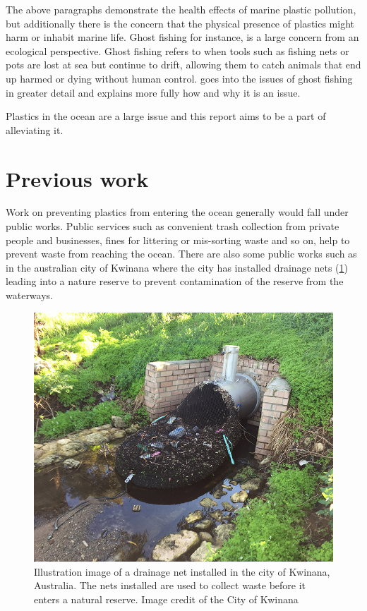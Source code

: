\documentclass[class=article, crop=false]{standalone}
\begin{document}
The above paragraphs demonstrate the health effects of marine plastic pollution, but additionally there is the concern that the physical presence of plastics might harm or inhabit marine life. Ghost fishing for instance, is a large concern from an ecological perspective. Ghost fishing refers to when tools such as fishing nets or pots are lost at sea but continue to drift, allowing them to catch animals that end up harmed or dying without human control. \citet{matsuoka_review_2005} goes into the issues of ghost fishing in greater detail and explains more fully how and why it is an issue.

Plastics in the ocean are a large issue and this report aims to be a part of alleviating it.


\section{Previous work}
Work on preventing plastics from entering the ocean generally would fall under public works. Public services such as convenient trash collection from private people and businesses, fines for littering or mis-sorting waste and so on, help to prevent waste from reaching the ocean. There are also some public works such as in the australian city of Kwinana where the city has installed drainage nets (\cref{fig:waste_net}) leading into a nature reserve to prevent contamination of the reserve from the waterways.

\begin{figure}
	\centering
	\includegraphics{waste_net}
	\caption{Illustration image of a drainage net installed in the city of Kwinana, Australia. The nets installed are used to collect waste before it enters a natural reserve. Image credit of the City of Kwinana}
	\label{fig:waste_net}
\end{figure}
\end{document}
